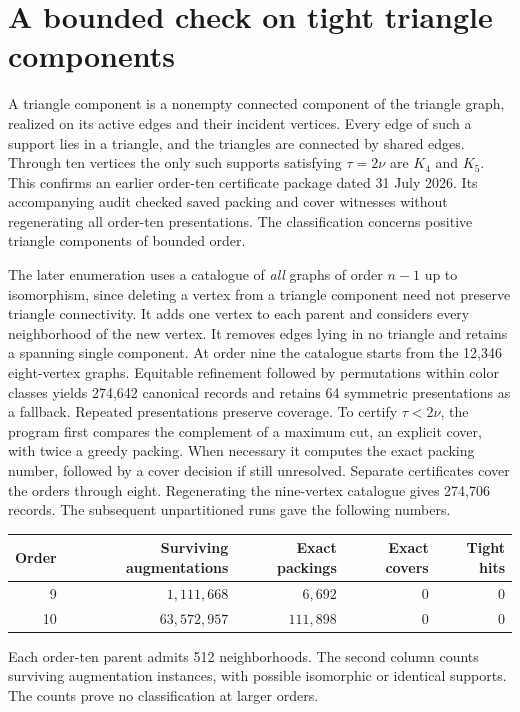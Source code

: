 \documentclass[11pt,a4paper]{amsart}
\begin{document}
\section{A bounded check on tight triangle components}\label{sec:census}
A triangle component is a nonempty connected component of the
triangle graph, realized on its active edges and their incident
vertices. Every edge of such a support lies in a triangle,
and the triangles are connected by shared edges. Through ten
vertices the only such supports satisfying $\tau=2\nu$ are
$K_4$ and $K_5$. This confirms an earlier order-ten certificate
package dated 31 July 2026. Its accompanying audit checked saved
packing and cover witnesses without regenerating all order-ten
presentations. The classification concerns positive triangle
components of bounded order.

 
The later enumeration uses a catalogue of \emph{all} graphs of
order $n-1$ up to isomorphism, since deleting a vertex from a
triangle component need not preserve triangle connectivity.
It adds one vertex to each parent and considers every neighborhood
of the new vertex. It removes
edges lying in no triangle and retains a spanning single
component. At order nine the catalogue starts from the 12,346
eight-vertex graphs. Equitable refinement followed by permutations
within color classes yields 274,642 canonical records and retains
64 symmetric presentations as a fallback. Repeated presentations
preserve coverage. To certify
$\tau<2\nu$, the program first compares the complement of a
maximum cut, an explicit cover, with twice a greedy packing.
When necessary it computes the exact packing number, followed
by a cover decision if still unresolved. Separate certificates
cover the orders through eight. Regenerating the nine-vertex
catalogue gives 274,706 records. The subsequent unpartitioned
runs gave the following numbers.
\begin{center}\small
\begin{tabular}{@{}rrrrr@{}}\hline
Order & Surviving augmentations & Exact packings & Exact covers & Tight hits\\ \hline
9 & $1{,}111{,}668$ & $6{,}692$ & 0 & 0\\
10 & $63{,}572{,}957$ & $111{,}898$ & 0 & 0\\ \hline
\end{tabular}
\end{center}
Each order-ten parent admits 512 neighborhoods. The second
column counts surviving augmentation instances, with possible
isomorphic or identical supports. The counts prove no
classification at larger orders.
\end{document}
